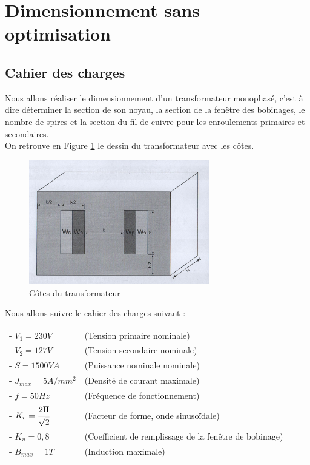 \section{Dimensionnement sans optimisation}
\subsection{Cahier des charges}
Nous allons réaliser le dimensionnement d'un transformateur monophasé, c'est à dire déterminer la section de son noyau, la section de la fenêtre des bobinages, le nombre de spires et la section du fil de cuivre pour les enroulements primaires et secondaires.\\
On retrouve en Figure \ref{img:cotesTransfo} le dessin du transformateur avec les côtes.\\

\begin{figure}
	\begin{center}
	\includegraphics[width=0.7\textwidth]{images/dessin_init_transfo.jpg}
	\caption{Côtes du transformateur}\label{img:cotesTransfo}
	\end{center}
\end{figure}
\FloatBarrier 

Nous allons suivre le cahier des charges suivant : \\
\begin{tabular}{l l}
 - $V_1 = 230 V$	&(Tension primaire nominale)\\
 - $V_2 = 127 V$	&(Tension secondaire nominale)\\
 - $S = 1500 VA$	&(Puissance nominale nominale)\\
 - $J_{max} = 5 A/mm^2$	&(Densité de courant maximale)\\
 - $f = 50Hz$		&(Fréquence de fonctionnement)\\
 - $K_v = \cfrac{2\Pi}{\sqrt{2}}$	&(Facteur de forme, onde sinusoïdale)\\
 - $K_u = 0,8 $	&(Coefficient de remplissage de la fenêtre de bobinage)\\
 - $B_{max} = 1T$	&(Induction maximale)
\end{tabular}

